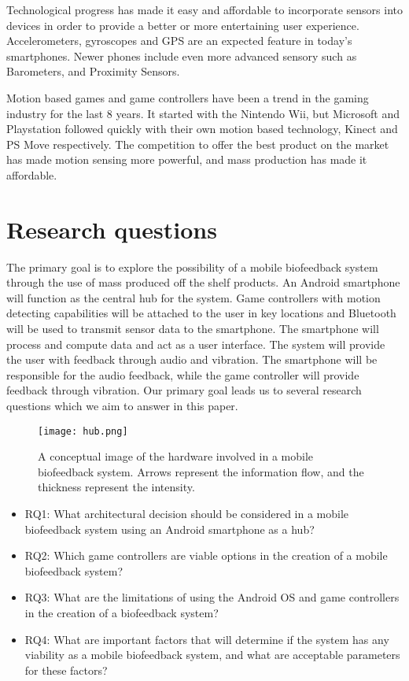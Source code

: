 Technological progress has made it easy and affordable to incorporate sensors into devices in order to provide a better or more entertaining user experience. Accelerometers, gyroscopes and GPS are an expected feature in today's smartphones. Newer phones include even more advanced sensory such as Barometers, and Proximity Sensors.

Motion based games and game controllers have been a trend in the gaming industry for the last 8 years. It started with the Nintendo Wii, but Microsoft and Playstation followed quickly with their own motion based technology, Kinect and PS Move respectively. The competition to offer the best product on the market has made motion sensing more powerful, and mass production has made it affordable.

\section{Research questions}
The primary goal is to explore the possibility of a mobile biofeedback system through the use of mass produced off the shelf products. An Android smartphone will function as the central hub for the system. Game controllers with motion detecting capabilities will be attached to the user in key locations and Bluetooth will be used to transmit sensor data to the smartphone. The smartphone will process and compute data and act as a user interface. The system will provide the user with feedback through audio and vibration. The smartphone will be responsible for the audio feedback, while the game controller will provide feedback through vibration. Our primary goal leads us to several research questions which we aim to answer in this paper.

\begin{figure}[h!]
  \centering
    \texttt{[image: hub.png]}
    \caption{\footnotesize A conceptual image of the hardware involved in a mobile biofeedback system. Arrows represent the information flow, and the thickness represent the intensity.}
\end{figure}

\begin{itemize}
\item RQ1: What architectural decision should be considered in a mobile biofeedback system using an Android smartphone as a hub?
\item RQ2: Which game controllers are viable options in the creation of a mobile biofeedback system?
\item RQ3: What are the limitations of using the Android OS and game controllers in the creation of a biofeedback system?
\item RQ4: What are important factors that will determine if the system has any viability as a mobile biofeedback system, and what are acceptable parameters for these factors?
\end{itemize}

